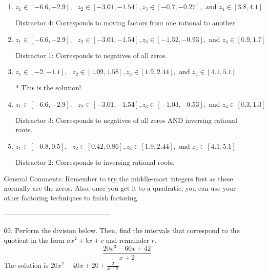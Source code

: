 \documentclass{extbook}[14pt]
\begin{document}
\begin{enumerate}[label=\Alph*.] 
\item $ z_1 \in [-6.6, -2.9], \text{   }  z_2 \in [-3.01, -1.54], z_3 \in [-0.7, -0.27], \text{   and   } z_4 \in [3.8, 4.1] $ 

  Distractor 4: Corresponds to moving factors from one rational to another. 
\item $ z_1 \in [-6.6, -2.9], \text{   }  z_2 \in [-3.01, -1.54], z_3 \in [-1.52, -0.93], \text{   and   } z_4 \in [0.9, 1.7] $ 

  Distractor 1: Corresponds to negatives of all zeros. 
\item $ z_1 \in [-2, -1.1], \text{   }  z_2 \in [1.09, 1.58], z_3 \in [1.9, 2.44], \text{   and   } z_4 \in [4.1, 5.1] $ 

 * This is the solution! 
\item $ z_1 \in [-6.6, -2.9], \text{   }  z_2 \in [-3.01, -1.54], z_3 \in [-1.03, -0.53], \text{   and   } z_4 \in [0.3, 1.3] $ 

  Distractor 3: Corresponds to negatives of all zeros AND inversing rational roots. 
\item $ z_1 \in [-0.8, 0.5], \text{   }  z_2 \in [0.42, 0.86], z_3 \in [1.9, 2.44], \text{   and   } z_4 \in [4.1, 5.1] $ 

  Distractor 2: Corresponds to inversing rational roots. 
\end{enumerate} 
 
General Comments: Remember to try the middle-most integers first as these normally are the zeros. Also, once you get it to a quadratic, you can use your other factoring techniques to finish factoring.

-----------------------------------------------

69. Perform the division below. Then, find the intervals that correspond to the quotient in the form $ax^2+bx+c$ and remainder $r$.
\[ \frac{20x^{3} -60 x + 42}{x + 2} \] 
The solution is $ 20x^{2} -40 x + 20 + \frac{2}{x + 2} $ 
\end{document}
